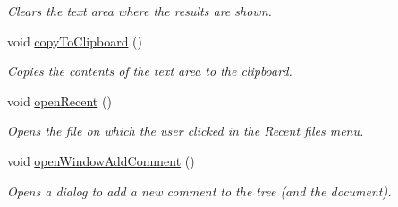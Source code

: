 \begin{DoxyCompactItemize}
\begin{DoxyCompactList}\small\item\em Clears the text area where the results are shown. \end{DoxyCompactList}\item 
\hypertarget{classMainWindow_a3867c6fa0d0e97c5a9dcc7dd67ce528f}{void \hyperlink{classMainWindow_a3867c6fa0d0e97c5a9dcc7dd67ce528f}{copy\-To\-Clipboard} ()}\label{classMainWindow_a3867c6fa0d0e97c5a9dcc7dd67ce528f}

\begin{DoxyCompactList}\small\item\em Copies the contents of the text area to the clipboard. \end{DoxyCompactList}\item 
\hypertarget{classMainWindow_acb446340737c00f7970ee3cf56982679}{void \hyperlink{classMainWindow_acb446340737c00f7970ee3cf56982679}{open\-Recent} ()}\label{classMainWindow_acb446340737c00f7970ee3cf56982679}

\begin{DoxyCompactList}\small\item\em Opens the file on which the user clicked in the Recent files menu. \end{DoxyCompactList}\item 
\hypertarget{classMainWindow_a71a0deb7cce3c55d9bec6c1ce69c79b3}{void \hyperlink{classMainWindow_a71a0deb7cce3c55d9bec6c1ce69c79b3}{open\-Window\-Add\-Comment} ()}\label{classMainWindow_a71a0deb7cce3c55d9bec6c1ce69c79b3}

\begin{DoxyCompactList}\small\item\em Opens a dialog to add a new comment to the tree (and the document). \end{DoxyCompactList}\end{DoxyCompactItemize}
